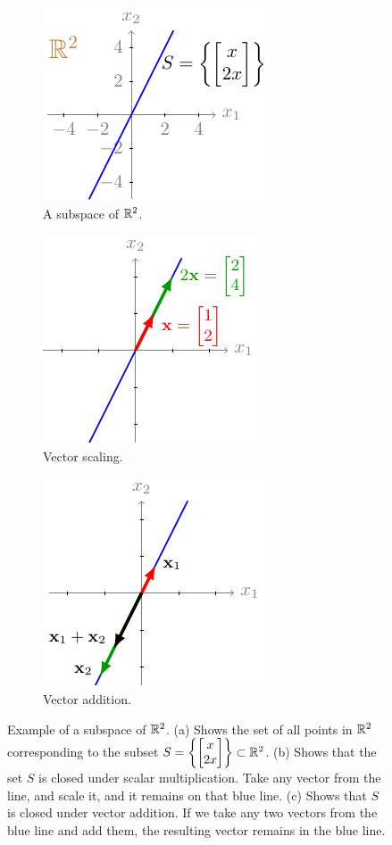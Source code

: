 \begin{figure}[h]
    \centering
    \begin{subfigure}[b]{0.32\textwidth}
        \includegraphics{figure/chapter01/subspace1(a).pdf}
        \caption{A subspace of $\mathbb{R}^2$.}
        \label{fig:ch01-subspace1}
    \end{subfigure}
    \begin{subfigure}[b]{0.32\textwidth}
        \centering
        \includegraphics{figure/chapter01/subspace1(b).pdf}
        \caption{Vector scaling.}
        \label{fig:ch01-subspace1-scale}
    \end{subfigure}
    \begin{subfigure}[b]{0.32\textwidth}
        \centering
        \includegraphics{figure/chapter01/subspace1(c).pdf}
        \caption{Vector addition.}
        \label{fig:ch01-subspace1-addition}
    \end{subfigure}
    \caption{Example of a subspace of $\mathbb{R}^2$. (a) Shows the set of all points in $\mathbb{R}^2$ corresponding to the subset $S = \left\{ \bmxc x \\ 2 x\emx\right\} \subset \mb{R}^2$. (b) Shows that the set $S$ is closed under scalar multiplication. Take any vector from the line, and scale it, and it remains on that blue line. (c) Shows that $S$ is closed under vector addition. If we take any two vectors from the blue line and add them, the resulting vector remains in the blue line.}
\end{figure}    
    
